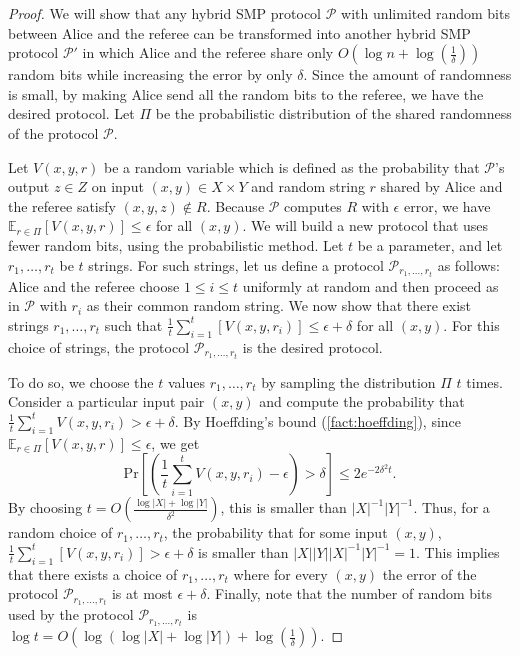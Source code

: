 \begin{proof}
    We will show that any hybrid SMP protocol $\mathcal{P}$ with unlimited random bits between Alice and the referee can be transformed into another hybrid SMP protocol $\mathcal{P}'$ in which Alice and the referee share only $O(\log n + \log (\frac{1}{\delta}))$ random bits while increasing the error by only $\delta$. Since the amount of randomness is small, by making Alice send all the random bits to the referee, we have the desired protocol. Let $\Pi$ be the probabilistic distribution of the shared randomness of the protocol $\mathcal{P}$.

    Let $V(x, y, r)$ be a random variable which is defined as the probability that $\mathcal{P}$’s output $z \in Z$ on input $(x, y) \in X \times Y$ and random string $r$ shared by Alice and the referee satisfy $(x, y, z) \notin R$. Because $\mathcal{P}$ computes $R$ with $\epsilon$ error, we have $\mathbb{E}_{r \in \Pi} [V(x,y,r)] \leq \epsilon$ for all $(x,y)$. We will build a new protocol that uses fewer random bits, using the probabilistic method. Let $t$ be a parameter, and let $r_1,\ldots,r_t$ be $t$ strings. For such strings, let us define a protocol $\mathcal{P}_{r_1,\ldots,r_t}$ as follows: Alice and the referee choose $1 \leq i \leq t$ uniformly at random and then proceed as in $\mathcal{P}$ with $r_i$ as their common random string. We now show that there exist strings $r_1,\ldots,r_t$ such that $\frac{1}{t} \sum_{i=1}^t [V(x,y,r_i)] \leq \epsilon + \delta$ for all $(x,y)$. For this choice of strings, the protocol $\mathcal{P}_{r_1,\ldots,r_t}$ is the desired protocol.

    To do so, we choose the $t$ values $r_1,\ldots,r_t$ by sampling the distribution $\Pi$ $t$ times. Consider a particular input pair $(x,y)$ and compute the probability that $\frac{1}{t} \sum_{i=1}^t V(x,y,r_i) > \epsilon + \delta$. By Hoeffding's bound (\cref{fact:hoeffding}), since $\mathbb{E}_{r \in \Pi}[V(x,y,r)] \leq \epsilon$, we get
    \[
        \mathrm{Pr} \left[ \left( \frac{1}{t}  \sum_{i=1}^t V(x,y,r_i) - \epsilon \right) > \delta \right] \leq 2e^{-2\delta^2 t}.
    \]
    By choosing $t=O(\frac{ \log |X| + \log |Y| }{\delta^2})$, this is smaller than $|X|^{-1} |Y|^{-1}$. Thus, for a random choice of $r_1,\ldots,r_t$, the probability that for some input $(x,y)$, $\frac{1}{t} \sum_{i=1}^t [V(x,y,r_i)] > \epsilon + \delta$ is smaller than $|X||Y| |X|^{-1} |Y|^{-1} = 1$. This implies that there exists a choice of $r_1,\ldots,r_t$ where for every $(x,y)$ the error of the protocol $\mathcal{P}_{r_1,\ldots,r_t}$ is at most $\epsilon + \delta$. Finally, note that the number of random bits used by the protocol $\mathcal{P}_{r_1,\ldots,r_t}$ is $\log t = O(\log (\log |X| + \log |Y|) + \log (\frac{1}{\delta}))$.
\end{proof}

